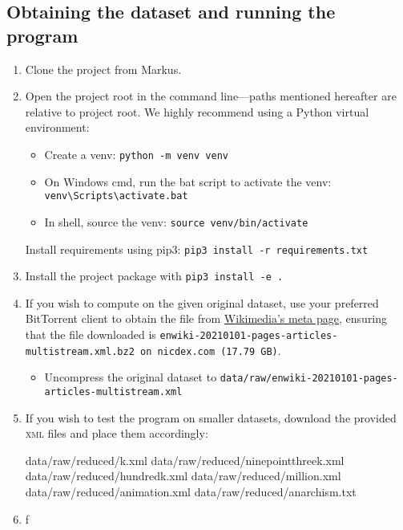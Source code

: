 \documentclass[fontsize=12pt]{article}
\newcommand{\py}[1]{\texttt{#1}}
\begin{document}
\begin{multicols}{2}
\section{Obtaining the dataset and running the program}
\begin{enumerate}
    \item Clone the project from Markus.
    \item Open the project root in the command line---paths mentioned hereafter are relative to project root. We highly recommend using a Python virtual environment: \begin{itemize}
        \item Create a venv: \py{python -m venv venv}
        \item On Windows cmd, run the bat script to activate the venv: \texttt{venv\textbackslash Scripts\textbackslash activate.bat}
        \item In shell, source the venv: \texttt{source venv/bin/activate}
    \end{itemize}
     Install requirements using pip3: \texttt{pip3 install -r requirements.txt}
    \item Install the project package with \py{pip3 install -e .}
    \item If you wish to compute on the given original dataset, use your preferred BitTorrent client to obtain the file from \href{https://meta.wikimedia.org/wiki/Data_dump_torrents#English_Wikipedia}{Wikimedia's meta page}, ensuring that the file downloaded is \texttt{enwiki-20210101-pages-articles-multistream.xml.bz2 on nicdex.com (17.79 GB)}. \begin{itemize}
        \item Uncompress the original dataset to \texttt{data/raw/enwiki-20210101-pages-articles-multistream.xml}
    \end{itemize}
    \item If you wish to test the program on smaller datasets, download the provided \textsc{xml} files and place them accordingly: \begin{verbatim*}
data/raw/reduced/k.xml
data/raw/reduced/ninepointthreek.xml
data/raw/reduced/hundredk.xml
data/raw/reduced/million.xml
data/raw/reduced/animation.xml
data/raw/reduced/anarchism.txt
\end{verbatim*}
    \item f
    

\end{enumerate}
\end{multicols}
\end{document}
